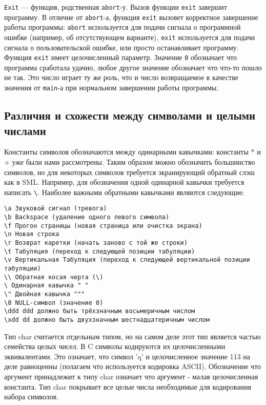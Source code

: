 \lstinline|Exit| --- функция, родственная \lstinline|abort|-у. Вызов функции \lstinline|exit| завершит программу. В отличие от \lstinline|abort|-а, функция \lstinline|exit| вызовет корректное завершение работы программы: \lstinline|abort| используется для подачи сигнала о программной ошибке (например, об отсутствующем варианте), \lstinline|exit| используется для подачи сигнала о пользовательской ошибке, или просто останавливает программу. Функция \lstinline|exit| имеет целочисленный параметр. Значение \lstinline|0| обозначает что программа сработала удачно, любое другое значение обозначает что что-то пошло не так. Это число играет ту же роль, что и число возвращаемое в качестве значения от \lstinline|main|-а при нормальном завершении работы программы.

\subsection{Различия и схожести между символами и целыми числами}\label{CharacterIntegerDiffSim}

Константы символов обозначаются между одинарными кавычками: константы * и + уже были нами рассмотрены. Таким образом можно обозначить большинство символов, но для некоторых символов требуется экранирующий обратный слэш как в SML. Например, для обозначения одной одинарной кавычки требуется написать \lstinline|\|. Наиболее важными обратными кавычками являются следующие:

\begin{lstlisting}
\a Звуковой сигнал (тревога)
\b Backspace (удаление одного левого символа)
\f Прогон страницы (новая страница или очистка экрана)
\n Новая строка
\r Возврат каретки (начать заново с той же строки)
\t Табуляция (переход к следующей позиции табуляции)
\v Вертикальная Табуляция (переход к следующей вертикальной позиции табуляции)
\\ Обратная косая черта (\)
\ Одинарная кавычка " "
\" Двойная кавычка """
\0 NULL-символ (значение 0)
\ddd ddd должно быть трёхзначным восьмеричным числом
\xdd dd должно быть двухзначным шестнадцатеричным числом
\end{lstlisting}

Тип char считается отдельным типом, но на самом деле этот тип является частью семейства целых чисел. В C символы кодируются их целочисленными эквивалентами. Это означает, что символ 'q' и целочисленное значение 113 на деле равноценны (полагаем что используется кодировка ASCII). Обозначение что аргумент принадлежит к типу char означает что аргумент - малая целочисленная константа. Тип char покрывает все целые числа необходимые для кодирования набора символов.

